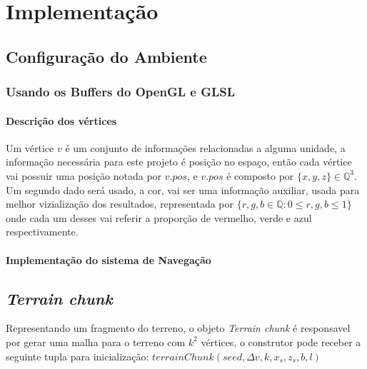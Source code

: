 


\chapter{Implementação}

\section{Configuração do Ambiente}

\subsection{Usando os Buffers do OpenGL e GLSL}

\subsubsection{Descrição dos vértices}
Um vértice $v$ é um conjunto de informações relacionadas a alguma unidade, %
a informação necessária para este projeto é posição no espaço, então cada vértice
vai possuir uma posição notada por $v.pos$, e $v.pos$ é composto por 
$\{x, y, z\} \in \mathbb{Q}^3$. Um segundo dado será usado, a cor, vai ser uma 
informação auxiliar, usada para melhor vizialização dos resultados, 
representada por $\{r, g, b \in \mathbb{Q}:0 \leq r, g, b \leq 1\}$ onde cada um desses
vai referir a proporção de vermelho, verde e azul respectivamente.

\subsubsection{Implementação do sistema de Navegação}

\section{\textit{Terrain chunk}}
Representando um fragmento do terreno, o objeto \textit{Terrain chunk} é responsavel
por gerar uma malha para o terreno com $k^2$ vértices, o construtor pode receber 
a seguinte tupla para inicialização: 
$terrainChunk(seed, \Delta{v}, k, x_{s}, z_{s}, b, l)$

